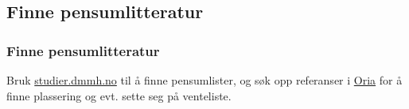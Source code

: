 \documentclass{beamer}
\begin{document}
\subsection{Finne pensumlitteratur}
\begin{frame}
  \frametitle{Finne pensumlitteratur}
  Bruk \href{https://studier.dmmh.no}{studier.dmmh.no} til å finne pensumlister, og søk opp referanser i \href{http://bibsys-almaprimo.hosted.exlibrisgroup.com/primo_library/libweb/action/search.do?vid=DMMH}{Oria} for å finne plassering og evt. sette seg på venteliste.
\end{frame}
\end{document}
